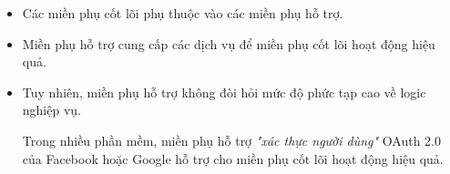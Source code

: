 \begin{itemize}

\item Các miền phụ cốt lõi phụ thuộc vào các miền phụ hỗ trợ.

\item Miền phụ hỗ trợ cung cấp các dịch vụ để miền phụ cốt lõi hoạt động hiệu quả.

\item Tuy nhiên, miền phụ hỗ trợ không đòi hỏi mức độ phức tạp cao về logic nghiệp vụ.

\begin{example} Trong nhiều phần mềm, miền phụ hỗ trợ \textit{"xác thực người dùng"} OAuth 2.0 của Facebook hoặc Google hỗ trợ cho miền phụ cốt lõi hoạt động hiệu quả.

\end{example}

\end{itemize}